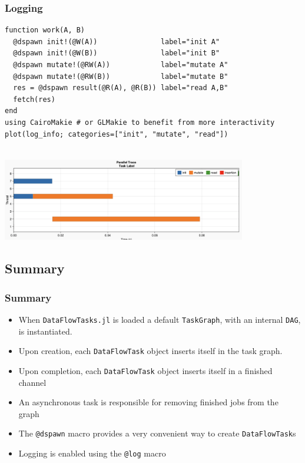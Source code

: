 \documentclass{beamer}
\newcommand{\DFT}{\texttt{DataFlowTasks.jl}}
\begin{document}
\begin{frame}[fragile]
\frametitle{Logging}

\begin{verbatim}
function work(A, B)
  @dspawn init!(@W(A))               label="init A"
  @dspawn init!(@W(B))               label="init B"
  @dspawn mutate!(@RW(A))            label="mutate A"
  @dspawn mutate!(@RW(B))            label="mutate B"
  res = @dspawn result(@R(A), @R(B)) label="read A,B"
  fetch(res)
end
using CairoMakie # or GLMakie to benefit from more interactivity
plot(log_info; categories=["init", "mutate", "read"])
    
  \end{verbatim}
    
  \center \includegraphics[width=0.8\textwidth]{figures/trace-output.png}
      
  \end{frame}

\subsection{Summary}

\begin{frame}
\frametitle{Summary}  

\begin{itemize}
  \item When \DFT{} is loaded a default \texttt{TaskGraph}, with an
  internal \texttt{DAG}, is instantiated.
  \item Upon creation, each \texttt{DataFlowTask} object inserts
  itself in the task graph.
  \item Upon completion, each \texttt{DataFlowTask} object inserts
  itself in a finished channel
  \item An asynchronous task is responsible for removing finished jobs from the graph
  \item The \texttt{@dspawn} macro provides a very convenient way to
  create \texttt{DataFlowTask}s
  \item Logging is enabled using the \texttt{@log} macro
\end{itemize} 
\end{frame}
\end{document}
